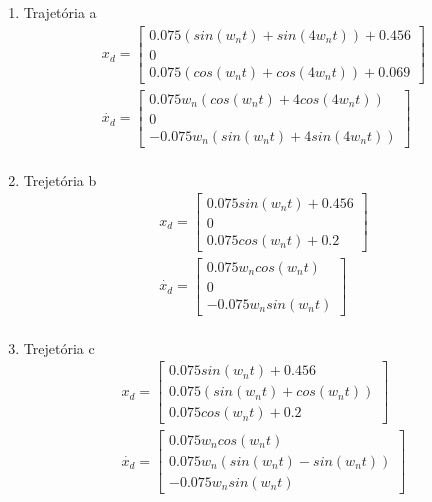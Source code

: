 \documentclass[a4paper,11pt]{article}
\theoremstyle{mytheor}
\begin{document}
\renewcommand{\labelenumi}{\alph{enumi}}
 \begin{enumerate}
   \item Trajetória a
   	\begin{gather*}
	x_{d} = 
	\begin{bmatrix} 
	0.075 (sin(w_n t) + sin( 4 w_n t)) + 0.456 \\ 
	0 \\ 
	0.075 (cos(w_n t) + cos( 4 w_n t)) + 0.069 
	\end{bmatrix} \\
	\dot{x_{d}} = 
	\begin{bmatrix}
	0.075 w_n (cos(w_n t) + 4 cos( 4 w_n t)) \\ 
	0 \\ 
	-0.075 w_n (sin(w_n t) + 4 sin( 4 w_n t)) 
	\end{bmatrix} \\
	\end{gather*}
   \item Trejetória b
   	\begin{gather*}
	x_{d} = 
	\begin{bmatrix} 
	0.075 sin(w_n t) + 0.456 \\ 
	0 \\ 
	0.075 cos(w_n t) + 0.2 
	\end{bmatrix} \\
	\dot{x_{d}} = 
	\begin{bmatrix} 
	0.075 w_n cos(w_n t) \\ 
	0 \\ 
	- 0.075 w_n sin(w_n t) 
	\end{bmatrix} \\
	\end{gather*}
   \item Trejetória c
   	\begin{gather*}
	x_{d} = 
	\begin{bmatrix} 
	0.075 sin(w_n t) + 0.456 \\ 
	0.075 (sin(w_n t) + cos(w_n t)) \\ 
	0.075 cos(w_n t) + 0.2 
	\end{bmatrix} \\
	\dot{x_{d}} = 
	\begin{bmatrix} 
	0.075 w_n cos(w_n t) \\ 
	0.075 w_n (sin(w_n t) - sin(w_n t)) \\ 
	- 0.075 w_n sin(w_n t) 
	\end{bmatrix} \\
	\end{gather*}
 \end{enumerate}
\end{document}
